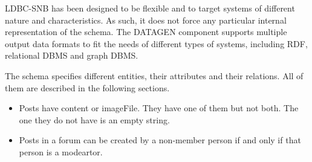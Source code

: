 LDBC-SNB has been designed to be flexible and to target systems of different
nature and characteristics. As such, it does not force any particular internal
representation of the schema. The DATAGEN component
supports multiple output data formats to
fit the needs of different types of systems, including RDF, relational DBMS and
graph DBMS.


\begin{figure}[p]
	\centering
\end{figure}

The schema specifies different entities, their attributes and their relations.
All of them are described in the following sections.

\begin{itemize}
    \item Posts have content or imageFile. They have one of them but not both. The one they do not have is an empty string.
    \item Posts in a forum can be created by a non-member person if and only if that person is a modeartor.
\end{itemize}

